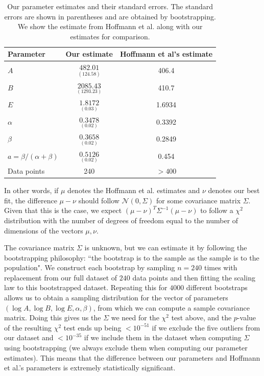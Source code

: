 \documentclass[twocolumn]{article}
\begin{document}
\begin{table}[ht]
\small
\centering
\begin{tabular}{@{}lcc@{}}
\toprule
Parameter & Our estimate   & Hoffmann et al's estimate \\ \midrule
$A$ & $\underset{(124.58)}{482.01}$ & 406.4 \\
$B$ & $\underset{(1293.23)}{2085.43}$ & 410.7 \\
$E$ & $\underset{(0.03)}{1.8172}$ & 1.6934 \\
$\alpha$ & $\underset{(0.02)}{0.3478}$ & 0.3392 \\
$\beta$ & $\underset{(0.02)}{0.3658}$ & 0.2849 \\
$a = \beta/(\alpha+\beta) $ & $\underset{(0.02)}{0.5126}$ & 0.454 \\
\midrule
Data points & 240 & $ > 400 $ \\ \bottomrule
\end{tabular}
   \caption[Caption]{\small Our parameter estimates and their standard errors. The standard errors are shown in parentheses and are obtained by bootstrapping. We show the estimate from Hoffmann et al. along with our estimates for comparison.\protect\footnotemark}
\label{tab:param-estimates} 
\end{table}

In other words, if \( \mu \) denotes the Hoffmann et al. estimates and \( \nu \) denotes our best fit, the difference \( \mu - \nu \) should follow \( \mathcal N(0, \Sigma) \) for some covariance matrix \( \Sigma \).  Given that this is the case, we expect \( (\mu - \nu)^T \Sigma^{-1} (\mu - \nu) \) to follow a \( \chi^2 \) distribution with the number of degrees of freedom equal to the number of dimensions of the vectors \( \mu, \nu \). 

The covariance matrix \( \Sigma \) is unknown, but we can estimate it by following the bootstrapping philosophy: ``the bootstrap is to the sample as the sample is to the population". We construct each bootstrap by sampling \( n = 240 \) times with replacement from our full dataset of \( 240 \) data points and then fitting the scaling law to this bootstrapped dataset. Repeating this for \( 4000 \) different bootstraps allows us to obtain a sampling distribution for the vector of parameters \( (\log A, \log B, \log E, \alpha, \beta) \), from which we can compute a sample covariance matrix. Doing this gives us the \( \Sigma \) we need for the \( \chi^2 \) test above, and the $p$-value of the resulting \( \chi^2 \) test ends up being $<10^{-51}$ if we exclude the five outliers from our dataset and $ < 10^{-35} $ if we include them in the dataset when computing \( \Sigma \) using bootstrapping (we always exclude them when computing our parameter estimates). This means that the difference between our parameters and Hoffmann et al.'s parameters is extremely statistically significant.
\end{document}
